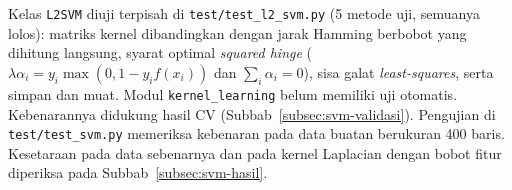 Kelas \texttt{L2SVM} diuji terpisah di \nolinkurl{test/test_l2_svm.py} (5 metode uji, semuanya lolos): matriks kernel dibandingkan dengan jarak Hamming berbobot yang dihitung langsung, syarat optimal \textit{squared hinge} ($\lambda\alpha_i = y_i\max(0, 1 - y_i f(x_i))$ dan $\sum_i \alpha_i = 0$), sisa galat \textit{least-squares}, serta simpan dan muat. Modul \texttt{kernel\_learning} belum memiliki uji otomatis. Kebenarannya didukung hasil CV (Subbab~\ref{subsec:svm-validasi}). Pengujian di \nolinkurl{test/test_svm.py} memeriksa kebenaran pada data buatan berukuran 400 baris. Kesetaraan pada data sebenarnya dan pada kernel Laplacian dengan bobot fitur diperiksa pada Subbab~\ref{subsec:svm-hasil}.
